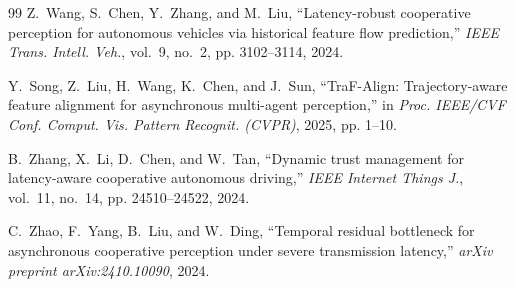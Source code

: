 \documentclass[10pt,journal,compsoc]{IEEEtran}
\begin{document}
\begin{thebibliography}{99}
Z.~Wang, S.~Chen, Y.~Zhang, and M.~Liu, ``Latency-robust cooperative perception for autonomous vehicles via historical feature flow prediction,'' \emph{IEEE Trans. Intell. Veh.}, vol.~9, no.~2, pp. 3102--3114, 2024.

Y.~Song, Z.~Liu, H.~Wang, K.~Chen, and J.~Sun, ``TraF-Align: Trajectory-aware feature alignment for asynchronous multi-agent perception,'' in \emph{Proc. IEEE/CVF Conf. Comput. Vis. Pattern Recognit. (CVPR)}, 2025, pp. 1--10.

B.~Zhang, X.~Li, D.~Chen, and W.~Tan, ``Dynamic trust management for latency-aware cooperative autonomous driving,'' \emph{IEEE Internet Things J.}, vol.~11, no.~14, pp. 24510--24522, 2024.

C.~Zhao, F.~Yang, B.~Liu, and W.~Ding, ``Temporal residual bottleneck for asynchronous cooperative perception under severe transmission latency,'' \emph{arXiv preprint arXiv:2410.10090}, 2024.

\end{thebibliography}
\end{document}
